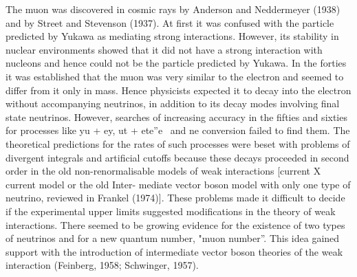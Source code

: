\documentclass[twoside]{article}
\begin{document}
The muon was discovered in cosmic rays by Anderson and Neddermeyer
(1938) and by Street and Stevenson (1937). At first it was confused with
the particle predicted by Yukawa as mediating strong interactions. However, its stability in nuclear environments showed that it did not have
a strong interaction with nucleons and hence could not be the particle
predicted by Yukawa. In the forties it was established that the muon was
very similar to the electron and seemed to differ from it only in mass.
Hence physicists expected it to decay into the electron without accompanying neutrinos, in addition to its decay modes involving final state neutrinos. However, searches of increasing accuracy in the fifties and sixties for processes like yu + ey, ut + ete”e~ and ne conversion failed to
find them. The theoretical predictions for the rates of such processes
were beset with problems of divergent integrals and artificial cutoffs
because these decays proceeded in second order in the old non-renormalisable
models of weak interactions [current X current model or the old Inter-
mediate vector boson model with only one type of neutrino, reviewed in
Frankel (1974)]. These problems made it difficult to decide if the experimental upper limits suggested modifications in the theory of weak interactions. There seemed to be growing evidence for the existence of two
types of neutrinos and for a new quantum number, "muon number''. This
idea gained support with the introduction of intermediate vector boson
theories of the weak interaction (Feinberg, 1958; Schwinger, 1957).
\end{document}
